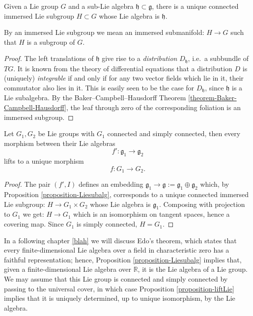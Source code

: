 \begin{proposition}
\label{proposition-Liesubalg}
 Given a Lie group $G$ and a sub-Lie algebra $\mathfrak h\subset \mathfrak g$, there is a unique connected immersed Lie subgroup $H\subset G$ whose Lie algebra is $\mathfrak h$.
\end{proposition}

By an immersed Lie subgroup we mean an immersed submanifold: $H\to G$ such that $H$ is a subgroup of $G$.


\begin{proof}
 The left translations of $\mathfrak h$ give rise to a \emph{distribution} $D_{\mathfrak h}$, i.e.\ a subbundle of $TG$. It is known from the theory of differential equations that a distribution $D$ is (uniquely) \emph{integrable} if and only if for any two vector fields which lie in it, their commutator also lies in it. This is easily seen to be the case for $D_{\mathfrak h}$, since $\mathfrak h$ is a Lie subalgebra. By the Baker--Campbell--Hausdorff Theorem \ref{theorem-Baker-Campbell-Hausdorff}, the leaf through zero of the corresponding foliation is an immersed subgroup.
\end{proof}


\begin{proposition}
\label{proposition-liftLie}
 Let $G_1, G_2$ be Lie groups with $G_1$ connected and simply connected, then every morphism between their Lie algebras 
 $$f':\mathfrak g_1\to\mathfrak g_2$$ 
 lifts to a unique morphism 
 $$f: G_1\to G_2.$$
\end{proposition}


\begin{proof}
The pair $(f', I)$ defines an embedding $\mathfrak g_1\to \mathfrak g:=\mathfrak g_1\oplus \mathfrak g_2$ which, by Proposition \ref{proposition-Liesubalg}, corresponds to a unique connected immersed Lie subgroup: $H\to G_1\times G_2$ whose Lie algebra is $\mathfrak g_1$. Composing with projection to $G_1$ we get: $H\to G_1$ which is an isomorphism on tangent spaces, hence a covering map. Since $G_1$ is simply connected, $H=G_1$. 
\end{proof}


\begin{remark}
 \label{remark-existsgroup}
In a following chapter \ref{blah} we will discuss Edo's theorem, which states that every finite-dimensional Lie algebra over a field in characteristic zero has a faithful representation; hence, Proposition \ref{proposition-Liesubalg} implies that, given a finite-dimensional Lie algebra over $\mathbb R$, it is the Lie algebra of a Lie group. We may assume that this Lie group is connected and simply connected by passing to the universal cover, in which case Proposition \ref{proposition-liftLie} implies that it is uniquely determined, up to unique isomorphism, by the Lie algebra.
\end{remark}






